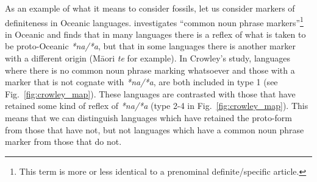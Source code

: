 \documentclass[12pt,letterpaper]{article}
\begin{document}
 


As an example of what it means to consider fossils, let us consider markers of definiteness in Oceanic languages. \citet{crowley1985common} investigates ``common noun phrase markers''\footnote{This term is more or less identical to a prenominal definite/specific article.} in Oceanic and finds that in many languages there is a reflex of what is taken to be proto-Oceanic \emph{*na/*a}, but that in some languages there is another marker with a different origin (M\={a}ori \emph{te} for example). In Crowley's study, languages where there is no common noun phrase marking whatsoever and those with a marker that is not cognate with \emph{*na/*a}, are both included in type 1 (see Fig.~\ref{fig:crowley_map}). These languages are contrasted with those that have retained some kind of reflex of \emph{*na/*a} (type 2-4 in Fig.~\ref{fig:crowley_map}). This means that we can distinguish languages which have retained the proto-form from those that have not, but not languages which have a common noun phrase marker from those that do not.
\end{document}

